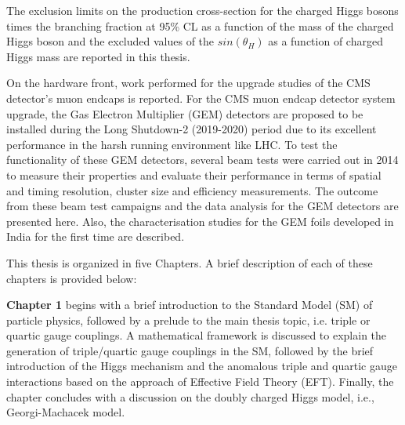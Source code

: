%
%
The exclusion limits on the production cross-section for the charged Higgs bosons times the branching fraction at 95\% CL as a function of the mass of the charged Higgs boson and the excluded values of the $sin(\theta_H)$ as a function of charged Higgs mass are reported in this thesis.

On the hardware front, work performed for the upgrade studies of the CMS detector's muon endcaps is reported. For the CMS muon endcap detector system upgrade, the Gas Electron Multiplier (GEM) detectors are proposed to be installed during the Long Shutdown-2 (2019-2020) period due to its excellent performance in the harsh running environment like LHC. To test the functionality of these GEM detectors, several beam tests were carried out in 2014 to measure their properties and evaluate their performance in terms of spatial and timing resolution, cluster size and efficiency measurements. The outcome from these beam test campaigns and the data analysis for the GEM detectors are presented here. Also, the characterisation studies for the GEM foils developed in India for the first time are described.

This thesis is organized in five Chapters. A brief description of each of these chapters is provided below:

\textbf{Chapter 1} begins with a brief introduction to the Standard Model (SM) of particle physics, followed by a prelude to the main thesis topic, i.e. triple or quartic gauge couplings. A mathematical framework is discussed to explain the generation of triple/quartic gauge couplings in the SM, followed by the brief introduction of the Higgs mechanism and the anomalous triple and quartic gauge interactions based on the approach of Effective Field Theory (EFT). Finally, the chapter concludes with a discussion on the doubly charged Higgs model, i.e., Georgi-Machacek model.

